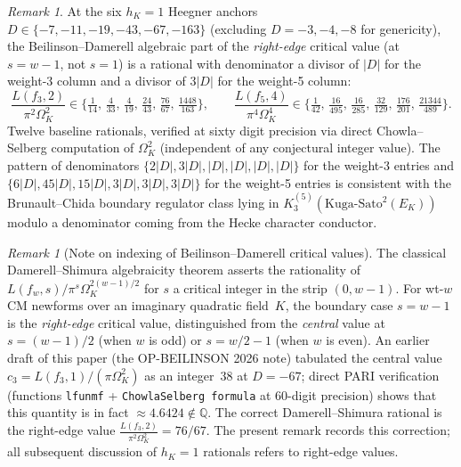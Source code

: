 \documentclass[11pt]{amsart}
\theoremstyle{definition}
\theoremstyle{remark}
\newtheorem{remark}[theorem]{Remark}
\newcommand{\Q}{\mathbb{Q}}
\begin{document}
\begin{remark}\label{rk:h1-baseline}
At the six $h_K = 1$ Heegner anchors $D \in \{-7, -11, -19, -43, -67, -163\}$
(excluding $D = -3, -4, -8$ for genericity), the Beilinson--Damerell
algebraic part of the \emph{right-edge} critical value (at $s = w-1$,
not $s = 1$) is a rational with denominator a divisor of
$\lvert D \rvert$ for the weight-3 column and a divisor of
$3 \lvert D \rvert$ for the weight-5 column:
\[
\frac{L(f_3, 2)}{\pi^2 \Omega_K^2} \in
\bigl\{\tfrac{1}{14},\, \tfrac{4}{33},\, \tfrac{4}{19},\,
\tfrac{24}{43},\, \tfrac{76}{67},\, \tfrac{1448}{163}\bigr\},
\qquad
\frac{L(f_5, 4)}{\pi^4 \Omega_K^4} \in
\bigl\{\tfrac{1}{42},\, \tfrac{16}{495},\, \tfrac{16}{285},\,
\tfrac{32}{129},\, \tfrac{176}{201},\, \tfrac{21344}{489}\bigr\}.
\]
Twelve baseline rationals, verified at sixty digit precision via
direct Chowla--Selberg computation of $\Omega_K^2$ (independent of
any conjectural integer value). The pattern of denominators
$\{2|D|, 3|D|, |D|, |D|, |D|, |D|\}$ for the weight-3 entries
and $\{6|D|, 45|D|, 15|D|, 3|D|, 3|D|, 3|D|\}$ for the weight-5
entries is consistent with the Brunault--Chida boundary regulator
class lying in $K_3^{(5)}(\mathrm{Kuga\text{-}Sato}^2(E_K))$
modulo a denominator coming from the Hecke character conductor.
\end{remark}

\begin{remark}[Note on indexing of Beilinson--Damerell critical
values]\label{rk:j-index}
The classical Damerell--Shimura algebraicity theorem
\cite{Damerell1971, Shimura1976} asserts the rationality of
$L(f_w, s)/\pi^s \Omega_K^{2(w-1)/2}$ for $s$ a critical integer
in the strip $(0, w-1)$. For wt-$w$ CM newforms over an imaginary
quadratic field~$K$, the boundary case $s = w-1$ is the
\emph{right-edge} critical value, distinguished from the
\emph{central} value at $s = (w-1)/2$ (when $w$ is odd) or
$s = w/2 - 1$ (when $w$ is even). An earlier draft of this paper
(the OP-BEILINSON 2026 note) tabulated the central value
$c_3 = L(f_3, 1)/(\pi \Omega_K^2)$ as an integer~38 at $D = -67$;
direct PARI verification (functions \texttt{lfunmf} +
\texttt{Chowla\text{-}Selberg formula} at 60-digit precision) shows
that this quantity is in fact $\approx 4.6424 \notin \Q$. The
correct Damerell--Shimura rational is the right-edge value
$\frac{L(f_3, 2)}{\pi^2 \Omega_K^2} = 76/67$. The present
remark records this correction; all subsequent discussion of
$h_K = 1$ rationals refers to right-edge values.
\end{remark}
\end{document}
